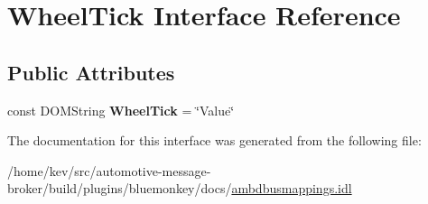 \hypertarget{interfaceWheelTick}{\section{Wheel\+Tick Interface Reference}
\label{interfaceWheelTick}
}
\subsection*{Public Attributes}
\begin{DoxyCompactItemize}
\item 
\hypertarget{interfaceWheelTick_a22e201499e96886a09786aa8c42f08e9}{const D\+O\+M\+String {\bfseries Wheel\+Tick} = \char`\"{}Value\char`\"{}}\label{interfaceWheelTick_a22e201499e96886a09786aa8c42f08e9}

\end{DoxyCompactItemize}


The documentation for this interface was generated from the following file\+:\begin{DoxyCompactItemize}
\item 
/home/kev/src/automotive-\/message-\/broker/build/plugins/bluemonkey/docs/\hyperlink{ambdbusmappings_8idl}{ambdbusmappings.\+idl}\end{DoxyCompactItemize}
